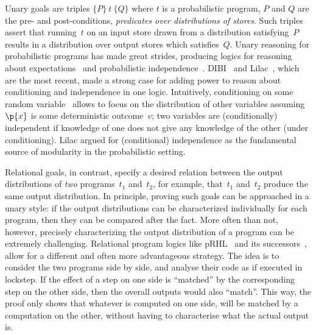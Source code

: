 \documentclass[acmsmall,nonacm,screen,appendix]{acmart}
\begin{document}
Unary goals are triples $ \{P\}\ t\ \{Q\}$ where
$t$ is a probabilistic program,
$P$ and $Q$ are the pre- and post-conditions,
\ie \emph{predicates over distributions of stores}.
Such triples assert that
running~$t$ on an input store drawn from a distribution satisfying~$P$
results in a distribution over output stores which satisfies~$Q$.
Unary reasoning for probabilistic programs has made great strides,
producing logics for reasoning about
  expectations~\cite{kozen1983PDL,Morgan:1996,kaminski2016weakest,kaminski2019thesis,aguirre2021pre,Bartocci2022moment}
  and probabilistic independence~\cite{barthe2019probabilistic}.
  DIBI~\cite{bao2021bunched} and Lilac~\cite{lilac},
  which are the most recent, made a strong case for adding power to reason
about conditioning and independence in one logic.
Intuitively, conditioning on some random variable~
allows to focus on the distribution of other variables
assuming~$\p{x}$ is some deterministic outcome~$v$;
two variables are (conditionally) independent if
knowledge of one does not give any knowledge of the other (under conditioning).
Lilac argued for (conditional) independence as the fundamental source of
modularity in the probabilistic setting.

Relational goals, in contrast, specify a desired relation between the output
distributions of \emph{two} programs~$t_1$ and~$t_2$,
for example, that~$t_1$ and~$t_2$ produce the same output distribution.
In principle, proving such goals can be approached in a unary style:
if the output distributions can be characterized
individually for each program,
then they can be compared after the fact.
More often than not, however,
precisely characterizing the output distribution of a program
can be extremely challenging.
Relational program logics like pRHL~\cite{barthe2009formal}
and its successors~\cite{barthe2009formal,barthe2015coupling,hsu2017probabilistic,gregersen2023asynchronous,AguirreBGGS19},
allow for a different and often more advantageous strategy.
The idea is to consider the two programs side by side,
and analyse their code as if executed in lockstep.
If the effect of a step on one side is ``matched'' by the corresponding
step on the other side,
then the overall outputs would also ``match''.
This way, the proof only shows that whatever is computed on one side,
will be matched by a computation on the other, without having to characterise
what the actual output is.
\end{document}
